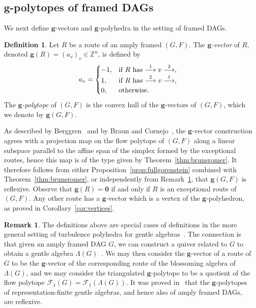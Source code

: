 \documentclass[12pt]{amsart}
\theoremstyle{definition}
\newtheorem{definition}[theorem]{Definition}
\newtheorem{remark}[theorem]{Remark}
\newcommand{\defn}[1]{\emph{\color{blue} #1}}
\newcommand\bg{\mathbf{g}}
\begin{document}
\subsection{\texorpdfstring{$\bg$}{g}-polytopes of framed DAGs}

We next define $\bg$-vectors and $\bg$-polyhedra in the setting of framed DAGs.

\begin{definition} \label{def:gvector}
Let $R$ be a route of an amply framed $(G,F)$.
The \defn{$\bg$-vector} of $R$, denoted $\bg(R) = (a_v)_{v} \in \mathbb{Z}^n$, is defined by
\[
a_v = \begin{cases}
    -1, & \hbox{if $R$ has $\stackrel{1}{\longrightarrow} v \stackrel{2}{\longrightarrow}$,} \\
    1, & \hbox{if $R$ has $\stackrel{2}{\longrightarrow} v \stackrel{1}{\longrightarrow}$,} \\
    0, & \hbox{otherwise.}     
\end{cases}
\]
The \defn{$\bg$-polytope} of $(G,F)$ is the convex hull of the $\bg$-vectors of $(G,F)$, which we denote by $\bg(G,F)$. 
\end{definition}

As described by Berggren~\cite{Berggren} and by Braun and Cornejo~\cite{BraunCornejo}, the $\bg$-vector construction agrees with a projection map on the flow polytope of $(G,F)$ along a linear subspace parallel to the affine span of the simplex formed by the exceptional routes, hence this map is of the type given by Theorem~\ref{thm:brunsromer}.
It therefore follows from either Proposition~\ref{prop:fullgorenstein} combined with Theorem~\ref{thm:brunsromer}, or independently from Remark~\ref{rem:gentleg}, that $\bg(G,F)$ is reflexive.
Observe that $\bg(R) =\mathbf{0}$ if and only if $R$ is an exceptional route of $(G,F)$.
Any other route has a $\bg$-vector which is a vertex of the $\bg$-polyhedron, as proved in Corollary~\ref{cor:vertices}.

\begin{remark}\label{rem:gentleg}
The definitions above are special cases of definitions in the more general setting of turbulence polyhedra for gentle algebras~\cite{Berggren}.
The connection is that given an amply framed DAG $G$, we can construct a quiver related to $G$ to obtain a gentle algebra $\Lambda(G)$~\cite{Polytopes2}. 
We may then consider the $\bg$-vector of a route of $G$ to be the $\bg$-vector of the corresponding route of the blossoming algebra of $\Lambda(G)$, and we may consider the triangulated $\bg$-polytope to be a quotient of the flow polytope $\mathcal F_1(G)=\mathcal F_1(\Lambda(G))$.
It was proved in~\cite{AHIKM,Berggren} that the $\bg$-polytopes of representation-finite gentle algebras, and hence also of amply framed DAGs, are reflexive.
\end{remark}
\end{document}
